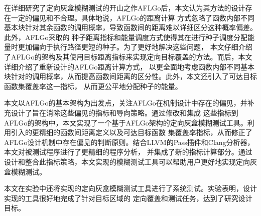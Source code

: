 \documentclass[bachelor]{njupthesis}
\begin{document}
在详细研究了定向灰盒模糊测试的开山之作AFLGo后，本文认为其方法的设计存在一定的偏见和不合理。具体地说，AFLGo的距离计算
方式忽略了函数内部不同基本块针对其余函数的调用概率，导致函数间的距离难以详细区分这种概率偏差。此外，AFLGo采取的
种子距离指标和能量调度方式使得其在进行种子调度分配能量时更加偏向于执行路径更短的种子。为了更好地解决这些问题，
本文仔细介绍了AFLGo的架构及其使用目标距离指标来实现定向目标覆盖的方法。而后，本文详细介绍了重新设计的AFLGo距离计算方式，
以更全面地考虑函数内部不同基本块针对的调用概率，从而提高函数间距离的区分性。此外，本文还引入了可达目标函数集覆盖率这一指标，
从而更公平地分配种子的能量。

本文以AFLGo的基本架构为出发点，关注AFLGo在机制设计中存在的偏见，并补充设计了旨在消除这些偏见的指标和导向策略。通过修改和集成
这些指标到AFLGo的架构中，本文实现了一个基于AFLGo架构的定向灰盒模糊测试工具。利用引入的更精细的函数间距离定义以及可达目标函数
集覆盖率指标，从而修正了AFLGo设计机制中存在偏见的判断原则。结合LLVM的Pass插件和Clang分析器，本文对被测试程序进行了更精细的程序分析，
并集成了新的指标计算部分。通过设计和整合此指标策略，本文实现的模糊测试工具可以帮助用户更好地实现定向灰盒模糊测试。

本文在实验中还将实现的定向灰盒模糊测试工具进行了系统测试。实验表明，设计实现的工具很好地完成了针对目标区域的
定向覆盖和测试任务，达到了研究设计目标。
\end{document}

